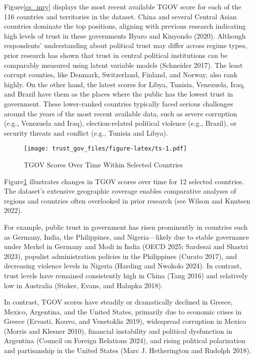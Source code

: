 \documentclass[
  12pt,
]{article}
\begin{document}
Figure\nobreakspace{}\ref{cs_mry} displays the most recent available TGOV score for each of the 116 countries and territories in the dataset.
China and several Central Asian countries dominate the top positions, aligning with previous research indicating high levels of trust in these governments Byaro and Kinyondo (2020).
Although respondents' understanding about political trust may differ across regime types, prior research has shown that trust in central political institutions can be comparably measured using latent variable models (Schneider 2017).
The least corrupt counties, like Denmark, Switzerland, Finland, and Norway, also rank highly.
On the other hand, the latest scores for Libya, Tunisia, Venezuela, Iraq, and Brazil have them as the places where the public has the lowest trust in government.
These lower-ranked countries typically faced serious challenges around the years of the most recent available data, such as severe corruption (e.g., Venezuela and Iraq), election-related political violence (e.g., Brazil), or security threats and conflict (e.g., Tunisia and Libya).

\begin{figure}
\centering
\texttt{[image: trust\_gov\_files/figure-latex/ts-1.pdf]}
\caption{\label{fig:ts}TGOV Scores Over Time Within Selected Countries \label{ts_plots}}
\end{figure}

Figure\nobreakspace{}\ref{ts_plots} illustrates changes in TGOV scores over time for 12 selected countries.
The dataset's extensive geographic coverage enables comparative analyses of regions and countries often overlooked in prior research (see Wilson and Knutsen 2022).

For example, public trust in government has risen prominently in countries such as Germany, India, the Philippines, and Nigeria---likely due to stable governance under Merkel in Germany and Modi in India (OECD 2025; Sardesai and Shastri 2023), populist administration policies in the Philippines (Curato 2017), and decreasing violence levels in Nigeria (Harding and Nwokolo 2024).
In contrast, trust levels have remained consistently high in China (Tang 2016) and relatively low in Australia (Stoker, Evans, and Halupka 2018).

In contrast, TGOV scores have steadily or dramatically declined in Greece, Mexico, Argentina, and the United States, primarily due to economic crises in Greece (Ervasti, Kouvo, and Venetoklis 2019), widespread corruption in Mexico (Morris and Klesner 2010), financial instability and political dysfunction in Argentina (Council on Foreign Relations 2024), and rising political polarization and partisanship in the United States (Marc J. Hetherington and Rudolph 2018).
\end{document}
